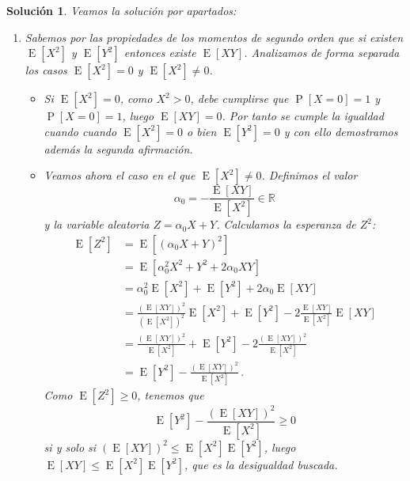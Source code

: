 \documentclass[
  a4paper,
  spanish,
  12pt,
]{scrartcl}
\theoremstyle{ejercicio-style}
\theoremstyle{remark-style}
\newtheorem*{sol}{Solución}
\begin{document}
\begin{sol}
  Veamos la solución por apartados: \begin{enumerate}
    \item Sabemos por las propiedades de los momentos de segundo orden que si existen \(\operatorname{E}[X^2]\) y \(\operatorname{E}[Y^2]\) entonces existe \(\operatorname{E}[XY]\). 
    Analizamos de forma separada los casos \(\operatorname{E}[X^2] = 0\) y \(\operatorname{E}[X^2] \neq 0\).
  	  \begin{itemize}
        \item Si \(\operatorname E[X^2] = 0\), como \(X^2 > 0\), debe cumplirse que \(\operatorname{P}[X=0] = 1\) y \(\operatorname{P}[X=0] = 1\), luego \(\operatorname{E}[XY]=0\). 
        Por tanto se cumple la igualdad cuando cuando \(\operatorname{E}[X^2] = 0\) o bien \(\operatorname{E}[Y^2] = 0\) y con ello demostramos además la segunda afirmación.
  	    
  	    \item Veamos ahora el caso en el que \(\operatorname E[X^2] \neq 0\). 
  	      Definimos el valor \[\alpha_0 = -\frac{\operatorname{E}[XY]}{\operatorname{E}[X^2]} \in \mathbb{R}\] y la variable aleatoria \(Z=\alpha_0 X + Y\).
  	      Calculamos la esperanza de \(Z^2\):
  	      \begin{align*}
  	        \operatorname{E}[Z^2] &= \operatorname{E}\left[(\alpha_0 X + Y)^2\right] \\
  	        &= \operatorname{E}[\alpha_0^2 X^2 + Y^2 + 2\alpha_0 X Y] \\ 
  	        &= \alpha_0^2 \operatorname{E}[X^2] + \operatorname{E}[Y^2] + 2 \alpha_0 \operatorname{E}[XY] \\
  	        &= \frac{\left(\operatorname{E}[XY]\right)^2}{\left(\operatorname{E}[X^2]\right)^2} \operatorname{E}[X^2] + \operatorname{E}[Y^2] - 2\frac{\operatorname{E}[XY]}{\operatorname{E}[X^2]} \operatorname{E}[XY] \\
  	        &= \frac{\left(\operatorname{E}[XY]\right)^2}{\operatorname{E}[X^2]} + \operatorname{E}[Y^2] - 2\frac{\left(\operatorname{E}[XY]\right)^2}{\operatorname{E}[X^2]} \\
  	        &= \operatorname{E}[Y^2] - \frac{\left(\operatorname{E}[XY]\right)^2}{\operatorname{E}[X^2]}\,.
  	      \end{align*}
  	      Como \(\operatorname{E}[Z^2] \geq 0\), tenemos que \[\operatorname{E}[Y^2] - \frac{\left(\operatorname{E}[XY]\right)^2}{\operatorname{E}[X^2]} \geq 0\] si y solo si \(\left(\operatorname{E}[XY]\right)^2 \leq \operatorname{E}[X^2] \operatorname{E}[Y^2]\), luego \(\operatorname{E}[XY] \leq \operatorname{E}[X^2] \operatorname{E}[Y^2]\), que es la desigualdad buscada.
  	  \end{itemize}
  	

\end{enumerate}
\end{sol}
\end{document}
